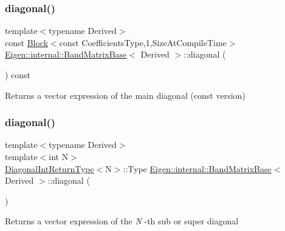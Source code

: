 \subsubsection{\texorpdfstring{diagonal()}{diagonal()}\hspace{0.1cm}{\footnotesize\ttfamily [2/6]}}
{\footnotesize\ttfamily template$<$typename Derived$>$ \\
const \mbox{\hyperlink{class_eigen_1_1_block}{Block}}$<$const Coefficients\+Type,1,Size\+At\+Compile\+Time$>$ \mbox{\hyperlink{class_eigen_1_1internal_1_1_band_matrix_base}{Eigen\+::internal\+::\+Band\+Matrix\+Base}}$<$ Derived $>$\+::diagonal (\begin{DoxyParamCaption}{ }\end{DoxyParamCaption}) const\hspace{0.3cm}{\ttfamily [inline]}}

\begin{DoxyReturn}{Returns}
a vector expression of the main diagonal (const version) 
\end{DoxyReturn}
\mbox{\label{class_eigen_1_1internal_1_1_band_matrix_base_a1d98143681d5c1e2709ce18332a939dc}} 
\subsubsection{\texorpdfstring{diagonal()}{diagonal()}\hspace{0.1cm}{\footnotesize\ttfamily [3/6]}}
{\footnotesize\ttfamily template$<$typename Derived$>$ \\
template$<$int N$>$ \\
\mbox{\hyperlink{struct_eigen_1_1internal_1_1_band_matrix_base_1_1_diagonal_int_return_type}{Diagonal\+Int\+Return\+Type}}$<$N$>$\+::Type \mbox{\hyperlink{class_eigen_1_1internal_1_1_band_matrix_base}{Eigen\+::internal\+::\+Band\+Matrix\+Base}}$<$ Derived $>$\+::diagonal (\begin{DoxyParamCaption}{ }\end{DoxyParamCaption})\hspace{0.3cm}{\ttfamily [inline]}}

\begin{DoxyReturn}{Returns}
a vector expression of the {\itshape N} -\/th sub or super diagonal 
\end{DoxyReturn}
\mbox{\label{class_eigen_1_1internal_1_1_band_matrix_base_aa8a5c997afb4ebd9b43b9ff2e1078cf9}} 
